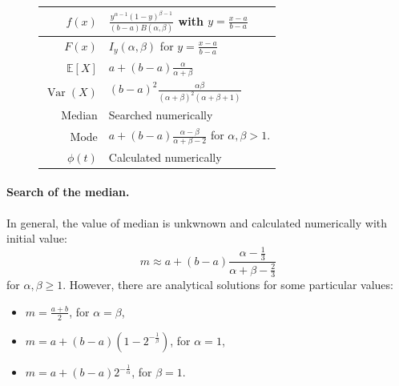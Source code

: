 \documentclass[a4paper,11pt]{article}
\theoremstyle{plain}
\theoremstyle{definition}
\newcommand{\ME}{\mathbb{E}}
\newcommand{\Var}{\operatorname{Var}}
\begin{document}
\begin{figure}[!htb]
\begin{minipage}{0.4\textwidth}
\begin{tabular}{| r | l |}
			\hline
			$f(x)$ & $\frac{y^{\alpha - 1}(1 - y)^{\beta - 1}}{(b-a)B(\alpha, \beta)}$ with $y = \frac{x - a}{b - a}$ \\
			\hline
			$F(x)$ & $I_{y}(\alpha, \beta)$ for $y = \frac{x - a}{b - a}$\\
			\hline
			$\ME[X]$ & $a + (b-a)\frac{\alpha}{\alpha + \beta}$ \\
			\hline
			$\Var(X)$ & $(b-a)^2\frac{ \alpha \beta}{(\alpha + \beta)^2 (\alpha + \beta + 1)}$ \\
			\hline
			Median & Searched numerically \\
			\hline
			Mode & $a + (b-a)\frac{\alpha - \beta}{\alpha + \beta - 2}$ for $\alpha, \beta > 1$. \\
			\hline
			$\phi(t)$ & Calculated numerically \\
			\hline
		\end{tabular}
	\end{minipage}
	\end{figure}
	
	\paragraph{Search of the median.}
	In general, the value of median is unkwnown and calculated numerically with initial value:
	\[
	m \approx a + (b-a)\frac{\alpha - \frac{1}{3} }{ \alpha + \beta - \frac{2}{3} }
	\]
	for $\alpha, \beta \geq 1$.	However, there are analytical solutions for some particular values:
	\begin{itemize}
		\item $m = \frac{a + b}{2}$, for $\alpha = \beta$,
		\item $m = a + (b-a)(1 - 2^{-\frac{1}{\beta}})$, for $\alpha = 1$,
		\item $m = a+(b-a)2^{-\frac{1}{\alpha}}$, for $\beta = 1$.
	\end{itemize}
	
\end{document}
